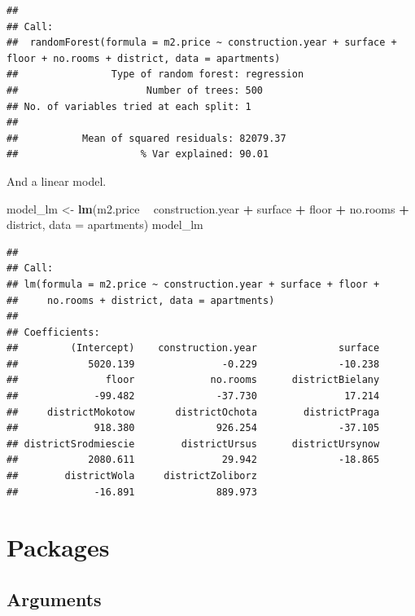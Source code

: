 \documentclass[]{krantz}
\newenvironment{Shaded}{\begin{snugshade}}{\end{snugshade}}
\newcommand{\DataTypeTok}[1]{\textcolor[rgb]{0.13,0.29,0.53}{#1}}
\newcommand{\KeywordTok}[1]{\textcolor[rgb]{0.13,0.29,0.53}{\textbf{#1}}}
\newcommand{\NormalTok}[1]{#1}
\newcommand{\OperatorTok}[1]{\textcolor[rgb]{0.81,0.36,0.00}{\textbf{#1}}}
\newcommand{\StringTok}[1]{\textcolor[rgb]{0.31,0.60,0.02}{#1}}
\theoremstyle{definition}
\theoremstyle{definition}
\theoremstyle{definition}
\theoremstyle{remark}
\begin{document}
\begin{verbatim}
## 
## Call:
##  randomForest(formula = m2.price ~ construction.year + surface +      floor + no.rooms + district, data = apartments) 
##                Type of random forest: regression
##                      Number of trees: 500
## No. of variables tried at each split: 1
## 
##           Mean of squared residuals: 82079.37
##                     % Var explained: 90.01
\end{verbatim}

And a linear model.

\begin{Shaded}
\begin{Highlighting}[]
\NormalTok{model_lm <-}\StringTok{ }\KeywordTok{lm}\NormalTok{(m2.price }\OperatorTok{~}\StringTok{ }\NormalTok{construction.year }\OperatorTok{+}\StringTok{ }\NormalTok{surface }\OperatorTok{+}\StringTok{ }\NormalTok{floor }\OperatorTok{+}\StringTok{ }\NormalTok{no.rooms }\OperatorTok{+}\StringTok{ }\NormalTok{district, }\DataTypeTok{data =}\NormalTok{ apartments)}
\NormalTok{model_lm}
\end{Highlighting}
\end{Shaded}

\begin{verbatim}
## 
## Call:
## lm(formula = m2.price ~ construction.year + surface + floor + 
##     no.rooms + district, data = apartments)
## 
## Coefficients:
##         (Intercept)    construction.year              surface  
##            5020.139               -0.229              -10.238  
##               floor             no.rooms      districtBielany  
##             -99.482              -37.730               17.214  
##     districtMokotow       districtOchota        districtPraga  
##             918.380              926.254              -37.105  
## districtSrodmiescie        districtUrsus      districtUrsynow  
##            2080.611               29.942              -18.865  
##        districtWola     districtZoliborz  
##             -16.891              889.973
\end{verbatim}

\hypertarget{Packages}{%
\section{Packages}\label{Packages}}

\hypertarget{arguments}{%
\subsection{Arguments}\label{arguments}}
\end{document}

